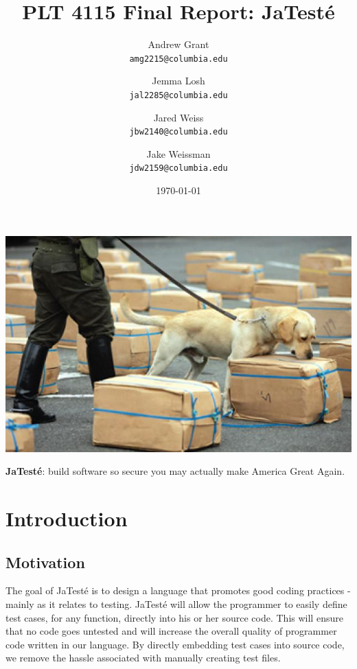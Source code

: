 \documentclass{article}
\title{PLT 4115 Final Report: \textbf{JaTest\'{e}}}
\author{
	Andrew Grant\\
	\texttt{amg2215@columbia.edu}
	\and
	Jemma Losh\\
	\texttt{jal2285@columbia.edu}
	\and
	Jared Weiss\\
	\texttt{jbw2140@columbia.edu}
	\and
	Jake Weissman\\
	\texttt{jdw2159@columbia.edu}
}
\date{\today}
\begin{document}
\maketitle
\includegraphics[width=\textwidth]{search_dog.jpg}

\begin{center}
{\huge \textbf{JaTest\'{e}}: build software so secure you may actually make America Great Again.}
\end{center}
\newpage


\tableofcontents
\newpage

\section{Introduction}

\subsection{Motivation}
The goal of JaTest\'{e} is to design a language that promotes good coding practices - mainly as it relates to testing.  JaTest\'{e} will allow the programmer to easily define test cases, for any function, directly into his or her source code. This will ensure that no code goes untested and will increase the overall quality of programmer code written in our language. By directly embedding test cases into source code, we remove the hassle associated with manually creating test files.
\end{document}
